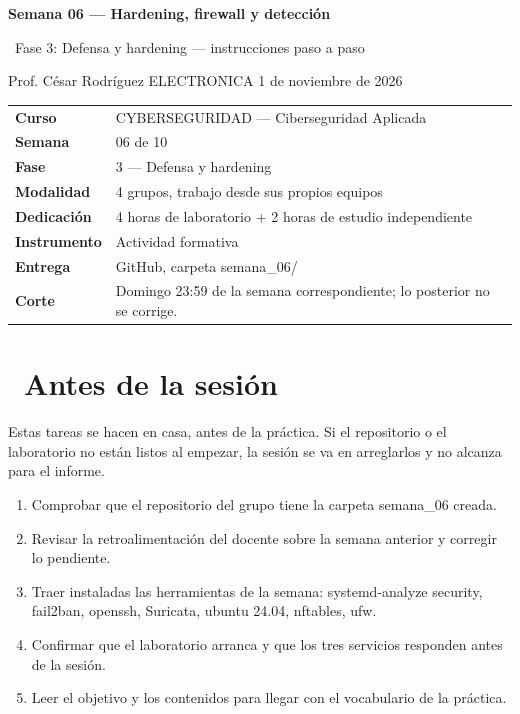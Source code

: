 \documentclass[11pt,a4paper]{article}
\newcommand{\iconoBanda}{microchip}
\newcommand{\bandaTitulo}[3][fondoOscuro]{%
  \begin{tcolorbox}[
    enhanced,
    colback=#1, colframe=#1,
    boxrule=0pt, arc=8pt, outer arc=8pt,
    width=\linewidth,
    top=18pt, bottom=6pt, left=14pt, right=14pt,
    borderline south={3.5pt}{0pt}{cyanNeon},
  ]
    \begin{minipage}[c]{0.07\linewidth}
      \centering
      \textcolor{cyanNeon}{\fontsize{30}{30}\selectfont\faIcon{\iconoBanda}}
    \end{minipage}%
    \hspace{8pt}%
    \begin{minipage}[c]{0.88\linewidth}
      {\fontsize{20}{24}\selectfont\bfseries\color{white}#2}\par\vspace{5pt}%
      \textcolor{cyanNeon!80!white}{\small\faIcon{angle-right}~#3}%
    \end{minipage}
    \vspace{4pt}
  \end{tcolorbox}%
  \vspace{8pt}%
}
\newcommand{\iconotexto}[2]{\textcolor{cyanNeon}{\faIcon{#1}}~#2}
\renewcommand{\iconoBanda}{shield-alt}
\begin{document}
\bandaTitulo[fondoOscuro]{Semana 06 --- Hardening, firewall y detección}{Fase 3: Defensa y hardening --- instrucciones paso a paso}

\begin{center}\small\color{grisTexto}Prof. César Rodríguez \textbar{} ELECTRONICA \textbar{} 1 de noviembre de 2026\end{center}

\begin{tabularx}{\linewidth}{@{}>{\raggedright\arraybackslash}p{4.6cm}X@{}}
\toprule
\textbf{Curso} & CYBERSEGURIDAD --- Ciberseguridad Aplicada \\
\textbf{Semana} & 06 de 10 \\
\textbf{Fase} & 3 --- Defensa y hardening \\
\textbf{Modalidad} & 4 grupos, trabajo desde sus propios equipos \\
\textbf{Dedicación} & 4 horas de laboratorio + 2 horas de estudio independiente \\
\textbf{Instrumento} & Actividad formativa \\
\textbf{Entrega} & GitHub, carpeta semana\_06/ \\
\textbf{Corte} & Domingo 23:59 de la semana correspondiente; lo posterior no se corrige. \\
\bottomrule
\end{tabularx}

\section{\iconotexto{clock}{Antes de la sesión}}

Estas tareas se hacen en casa, antes de la práctica. Si el repositorio o el laboratorio no están listos al empezar, la sesión se va en arreglarlos y no alcanza para el informe.

\begin{enumerate}[leftmargin=1.4em,itemsep=2pt,topsep=3pt]
  \item Comprobar que el repositorio del grupo tiene la carpeta semana\_06 creada.
  \item Revisar la retroalimentación del docente sobre la semana anterior y corregir lo pendiente.
  \item Traer instaladas las herramientas de la semana: systemd-analyze security, fail2ban, openssh, Suricata, ubuntu 24.04, nftables, ufw.
  \item Confirmar que el laboratorio arranca y que los tres servicios responden antes de la sesión.
  \item Leer el objetivo y los contenidos para llegar con el vocabulario de la práctica.
\end{enumerate}
\end{document}
